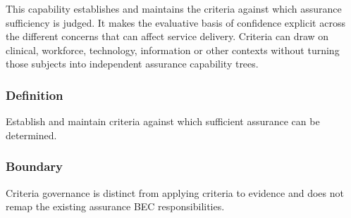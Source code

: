 This capability establishes and maintains the criteria against which assurance sufficiency is judged. It makes the evaluative basis of confidence explicit across the different concerns that can affect service delivery. Criteria can draw on clinical, workforce, technology, information or other contexts without turning those subjects into independent assurance capability trees.

\subsubsection*{Definition}

Establish and maintain criteria against which sufficient assurance can be determined.

\subsubsection*{Boundary}

Criteria governance is distinct from applying criteria to evidence and does not remap the existing assurance BEC responsibilities.

